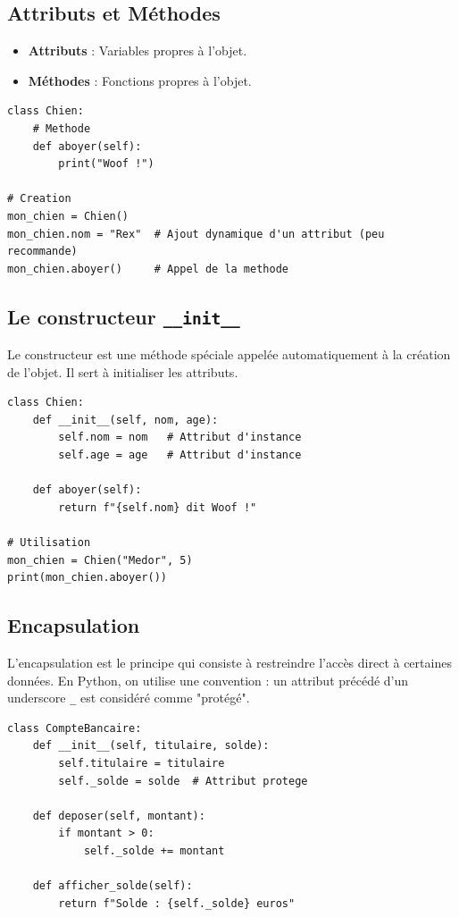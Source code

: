 \documentclass[a4paper,12pt]{article}
\begin{document}
\subsection{Attributs et Méthodes}
\begin{itemize}
    \item \textbf{Attributs} : Variables propres à l'objet.
    \item \textbf{Méthodes} : Fonctions propres à l'objet.
\end{itemize}
\begin{lstlisting}
class Chien:
    # Methode
    def aboyer(self):
        print("Woof !")

# Creation
mon_chien = Chien()
mon_chien.nom = "Rex"  # Ajout dynamique d'un attribut (peu recommande)
mon_chien.aboyer()     # Appel de la methode
\end{lstlisting}

\subsection{Le constructeur \texttt{\_\_init\_\_}}
Le constructeur est une méthode spéciale appelée automatiquement à la création de l'objet. Il sert à initialiser les attributs.
\begin{lstlisting}
class Chien:
    def __init__(self, nom, age):
        self.nom = nom   # Attribut d'instance
        self.age = age   # Attribut d'instance

    def aboyer(self):
        return f"{self.nom} dit Woof !"

# Utilisation
mon_chien = Chien("Medor", 5)
print(mon_chien.aboyer())
\end{lstlisting}

\subsection{Encapsulation}
L'encapsulation est le principe qui consiste à restreindre l'accès direct à certaines données. En Python, on utilise une convention : un attribut précédé d'un underscore \texttt{\_} est considéré comme "protégé".
\begin{lstlisting}
class CompteBancaire:
    def __init__(self, titulaire, solde):
        self.titulaire = titulaire
        self._solde = solde  # Attribut protege

    def deposer(self, montant):
        if montant > 0:
            self._solde += montant

    def afficher_solde(self):
        return f"Solde : {self._solde} euros"
\end{lstlisting}
\end{document}
